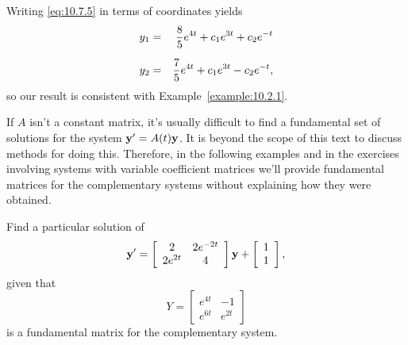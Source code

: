 \begin{examplesolution}
Writing \eqref{eq:10.7.5} in terms of coordinates yields
\begin{eqnarray*}
  y_{1} & = & \frac{8}{5}e^{4t}+c_{1}e^{3t}+c_{2}e^{-t} \\[2\jot]
  y_{2} & = & \frac{7}{5}e^{4t}+c_{1}e^{3t}-c_{2}e^{-t},
\end{eqnarray*}
so our result is consistent with Example~\ref{example:10.2.1}. \bbox
\end{examplesolution}

If $A$ isn't a constant matrix, it's usually difficult to find a fundamental set of solutions for
the system ${\bf y}'=A(t){\bf y}$. It is beyond the scope of this text to discuss methods for doing
this. Therefore, in the following examples and in the exercises involving systems with variable
coefficient matrices we'll provide fundamental matrices for the complementary systems without
explaining how they were obtained.

\begin{example}
  \label{example:10.7.2} \rm Find a particular solution of
  \begin{equation}
    \label{eq:10.7.6}{\bf y}'=\left[
    \begin{array}{cc}
      2       & 2e^{-2t} \\
      2e^{2t} & 4
    \end{array}\right]{\bf y}+\left[\begin{array}{l}1\\1\end{array}\right],
  \end{equation}
  given that
  \[
    Y=\left[
    \begin{array}{cc}
      e^{4t} & -1     \\
      e^{6t} & e^{2t}
    \end{array}\right]
  \]
  is a fundamental matrix for the complementary system.
\end{example}

